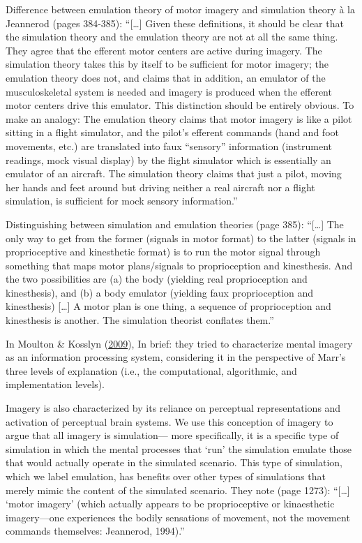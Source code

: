 \documentclass[a4paper,12pt,twoside,openright,oldfontcommands]{memoir}
\begin{document}
Difference between emulation theory of motor imagery and simulation
theory à la Jeannerod (pages 384-385): ``{[}\ldots{}{]} Given these
definitions, it should be clear that the simulation theory and the
emulation theory are not at all the same thing. They agree that the
efferent motor centers are active during imagery. The simulation theory
takes this by itself to be sufficient for motor imagery; the emulation
theory does not, and claims that in addition, an emulator of the
musculoskeletal system is needed and imagery is produced when the
efferent motor centers drive this emulator. This distinction should be
entirely obvious. To make an analogy: The emulation theory claims that
motor imagery is like a pilot sitting in a flight simulator, and the
pilot's efferent commands (hand and foot movements, etc.) are translated
into faux ``sensory'' information (instrument readings, mock visual
display) by the flight simulator which is essentially an emulator of an
aircraft. The simulation theory claims that just a pilot, moving her
hands and feet around but driving neither a real aircraft nor a flight
simulation, is sufficient for mock sensory information.''

Distinguishing between simulation and emulation theories (page 385):
``{[}\ldots{}{]} The only way to get from the former (signals in motor
format) to the latter (signals in proprioceptive and kinesthetic format)
is to run the motor signal through something that maps motor
plans/signals to proprioception and kinesthesis. And the two
possibilities are (a) the body (yielding real proprioception and
kinesthesis), and (b) a body emulator (yielding faux proprioception and
kinesthesis) {[}\ldots{}{]} A motor plan is one thing, a sequence of
proprioception and kinesthesis is another. The simulation theorist
conflates them.''

In Moulton \& Kosslyn
(\protect\hyperlink{ref-moulton_imagining_2009}{2009}), In brief: they
tried to characterize mental imagery as an information processing
system, considering it in the perspective of Marr's three levels of
explanation (i.e., the computational, algorithmic, and implementation
levels).

Imagery is also characterized by its reliance on perceptual
representations and activation of perceptual brain systems. We use this
conception of imagery to argue that all imagery is simulation--- more
specifically, it is a specific type of simulation in which the mental
processes that `run' the simulation emulate those that would actually
operate in the simulated scenario. This type of simulation, which we
label emulation, has benefits over other types of simulations that
merely mimic the content of the simulated scenario. They note (page
1273): ``{[}\ldots{}{]} `motor imagery' (which actually appears to be
proprioceptive or kinaesthetic imagery---one experiences the bodily
sensations of movement, not the movement commands themselves: Jeannerod,
1994).''
\end{document}
